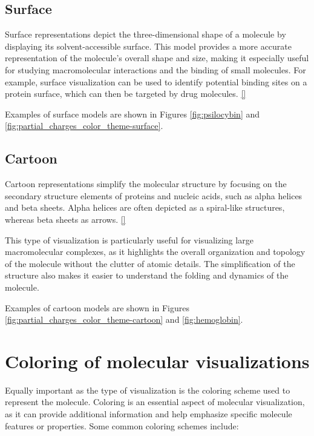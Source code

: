 \documentclass[
  digital,     %
  oneside,     %
  nosansbold,  %
  nocolorbold, %
  lof,         %
  lot,         %
]{fithesis4}
\begin{document}
\subsection{Surface}
\label{subsection:surface}

Surface representations depict the three-dimensional shape of a molecule by displaying its solvent-accessible surface. This model provides a more accurate representation of the molecule's overall shape and size, making it especially useful for studying macromolecular interactions and the binding of small molecules.
For example, surface visualization can be used to identify potential binding sites on a protein surface, which can then be targeted by drug molecules. \ref{}

Examples of surface models are shown in Figures \ref{fig:psilocybin} and \ref{fig:partial_charges_color_theme-surface}.

\subsection{Cartoon}
\label{subsection:cartoon}

Cartoon representations simplify the molecular structure by focusing on the secondary structure elements of proteins and nucleic acids, such as alpha helices and beta sheets. Alpha helices are often depicted as a spiral-like structures, whereas beta sheets as arrows. \ref{}

This type of visualization is particularly useful for visualizing large macromolecular complexes, as it highlights the overall organization and topology of the molecule without the clutter of atomic details. The simplification of the structure also makes it easier to understand the folding and dynamics of the molecule. \cite{tsai2003introduction}

Examples of cartoon models are shown in Figures \ref{fig:partial_charges_color_theme-cartoon} and \ref{fig:hemoglobin}.

\section{Coloring of molecular visualizations}
\label{subsection:coloring_of_molecular_visualizations}

Equally important as the type of visualization is the coloring scheme used to represent the molecule. Coloring is an essential aspect of molecular visualization, as it can provide additional information and help emphasize specific molecule features or properties. Some common coloring schemes include:
\end{document}
